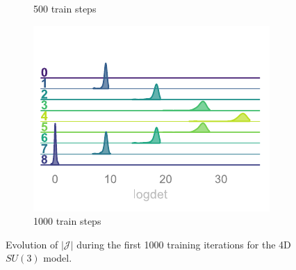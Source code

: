\documentclass[a4paper,11pt]{article}
\begin{document}
\begin{figure}[htpb!]
\begin{subfigure}{0.31\textwidth}
        \caption{\label{subfig:logdet2} 500 train steps}
    \end{subfigure}
    \hfill
    \begin{subfigure}{0.31\textwidth}
        \includegraphics[width=\textwidth]{assets/logdet-3.pdf}
        \caption{\label{subfig:logdet3} 1000 train steps}
    \end{subfigure}
    \caption{\label{fig:logdet}Evolution of $\left|\mathcal{J}\right|$ during the first 1000 training iterations for the 4D $SU(3)$ model.}
\end{figure}
%
%  
\end{document}
